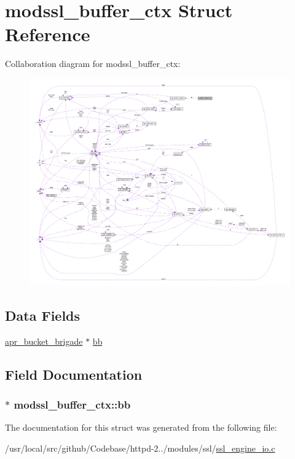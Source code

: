 \hypertarget{structmodssl__buffer__ctx}{}\section{modssl\+\_\+buffer\+\_\+ctx Struct Reference}
\label{structmodssl__buffer__ctx}


Collaboration diagram for modssl\+\_\+buffer\+\_\+ctx\+:
\nopagebreak
\begin{figure}[H]
\begin{center}
\leavevmode
\includegraphics[width=350pt]{structmodssl__buffer__ctx__coll__graph}
\end{center}
\end{figure}
\subsection*{Data Fields}
\begin{DoxyCompactItemize}
\item 
\hyperlink{structapr__bucket__brigade}{apr\+\_\+bucket\+\_\+brigade} $\ast$ \hyperlink{structmodssl__buffer__ctx_a191e5daeba128f104a07c61a0f9bc312}{bb}
\end{DoxyCompactItemize}


\subsection{Field Documentation}
\subsubsection[{\texorpdfstring{bb}{bb}}]{$\ast$ modssl\+\_\+buffer\+\_\+ctx\+::bb}\hypertarget{structmodssl__buffer__ctx_a191e5daeba128f104a07c61a0f9bc312}{}\label{structmodssl__buffer__ctx_a191e5daeba128f104a07c61a0f9bc312}


The documentation for this struct was generated from the following file\+:\begin{DoxyCompactItemize}
\item 
/usr/local/src/github/\+Codebase/httpd-\/2../modules/ssl/\hyperlink{ssl__engine__io_8c}{ssl\+\_\+engine\+\_\+io.\+c}\end{DoxyCompactItemize}
